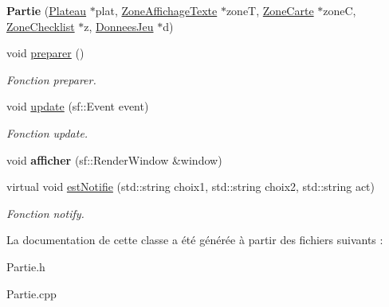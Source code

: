\begin{DoxyCompactItemize}
\item 
\hypertarget{classPartie_a1d763e94586edfdaa54cce895287f695}{{\bfseries \-Partie} (\hyperlink{classPlateau}{\-Plateau} $\ast$plat, \hyperlink{classZoneAffichageTexte}{\-Zone\-Affichage\-Texte} $\ast$zone\-T, \hyperlink{classZoneCarte}{\-Zone\-Carte} $\ast$zone\-C, \hyperlink{classZoneChecklist}{\-Zone\-Checklist} $\ast$z, \hyperlink{classDonneesJeu}{\-Donnees\-Jeu} $\ast$d)}\label{classPartie_a1d763e94586edfdaa54cce895287f695}

\item 
\hypertarget{classPartie_ab76c25c57551613a708ab39816d14a9a}{void \hyperlink{classPartie_ab76c25c57551613a708ab39816d14a9a}{preparer} ()}\label{classPartie_ab76c25c57551613a708ab39816d14a9a}

\begin{DoxyCompactList}\small\item\em \-Fonction preparer. \end{DoxyCompactList}\item 
\hypertarget{classPartie_a2c868f423c455e1aa0aebc9f3482cf8d}{void \hyperlink{classPartie_a2c868f423c455e1aa0aebc9f3482cf8d}{update} (sf\-::\-Event event)}\label{classPartie_a2c868f423c455e1aa0aebc9f3482cf8d}

\begin{DoxyCompactList}\small\item\em \-Fonction update. \end{DoxyCompactList}\item 
\hypertarget{classPartie_a2c00254bdd417a300342d1ba1eb5cec3}{void {\bfseries afficher} (sf\-::\-Render\-Window \&window)}\label{classPartie_a2c00254bdd417a300342d1ba1eb5cec3}

\item 
\hypertarget{classPartie_a39dcf2ff1dc8f4c7c81edea5e4f2cde8}{virtual void \hyperlink{classPartie_a39dcf2ff1dc8f4c7c81edea5e4f2cde8}{est\-Notifie} (std\-::string choix1, std\-::string choix2, std\-::string act)}\label{classPartie_a39dcf2ff1dc8f4c7c81edea5e4f2cde8}

\begin{DoxyCompactList}\small\item\em \-Fonction notify. \end{DoxyCompactList}\end{DoxyCompactItemize}


\-La documentation de cette classe a été générée à partir des fichiers suivants \-:\begin{DoxyCompactItemize}
\item 
\-Partie.\-h\item 
\-Partie.\-cpp\end{DoxyCompactItemize}
